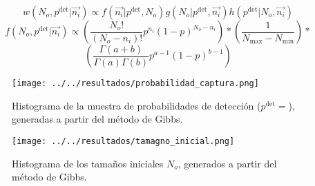 \begin{frame}
$$w(N_o,p^{\mbox{det}}|\vec{n_i})\propto f(\vec{n_i}|p^{\mbox{det}},N_o)
g(N_o|p^{\mbox{det}},\vec{n_i})h(p^{\mbox{det}}|N_o,\vec{n_i})$$
$$f(N_o,p^{\mbox{det}}|\vec{n_i})\propto\left( \frac{N_o!}{(N_o-n_i)!}p^{n_i}(1-p)^{N_o-n_i}\right)*
\left( \frac{1}{N_{\mbox{max}}-N_{\mbox{min}}} \right)*$$
$$\left(\frac{\Gamma(a+b)}{\Gamma(a)\Gamma(b)}p^{a-1}(1-p)^{b-1}\right)$$
\end{frame}
\begin{frame}
\begin{figure}[h]
\centering
\texttt{[image: ../../resultados/probabilidad\_captura.png]}
\caption{Histograma de la muestra de probabilidades de detecci\'on
($p^{\mbox{det}}=$), generadas a partir del m\'etodo de Gibbs.}
\label{fproCap}
\end{figure}
\end{frame}
\begin{frame}
\begin{figure}[h]
\centering
\texttt{[image: ../../resultados/tamagno\_inicial.png]}
\caption{Histograma de los tama\~nos iniciales
$N_o$, generados a partir del m\'etodo de Gibbs.}
\label{ftamIni}
\end{figure}
\end{frame}
\begin{frame}
\end{frame}
